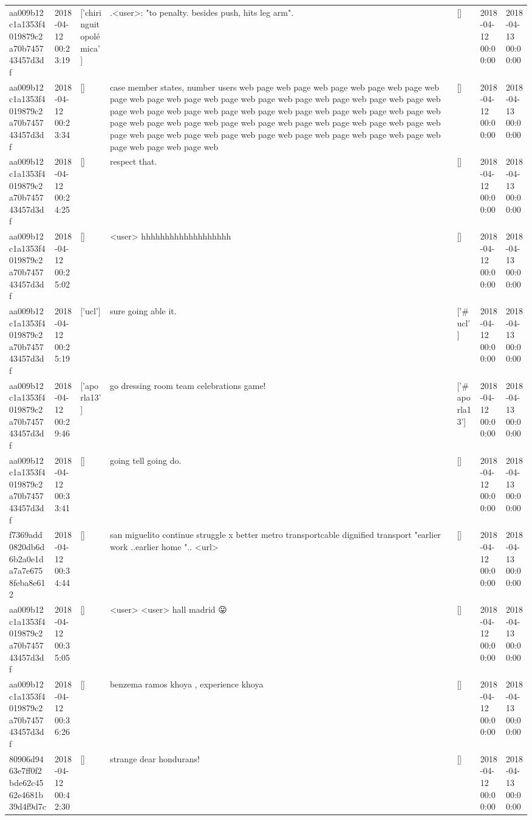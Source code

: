 \begin{tabular}{lllllll}
aa009b12c1a1353f4019879c2a70b745743457d3df & 2018-04-12 00:23:19 & ['chiringuitopolémica'] & .<user>: "to penalty. besides push, hits leg arm". & [] & 2018-04-12 00:00:00 & 2018-04-13 00:00:00 \\
aa009b12c1a1353f4019879c2a70b745743457d3df & 2018-04-12 00:23:34 & [] & case member states, number users web page web page web page web page web page web page web page web page web page web page web page web page web page web page web page web page web page web page web page web page web page web page web page web page web page web page web page web page web page web page web page web page web page web page web page web page web page web page web page web page web page web page web page web page web & [] & 2018-04-12 00:00:00 & 2018-04-13 00:00:00 \\
aa009b12c1a1353f4019879c2a70b745743457d3df & 2018-04-12 00:24:25 & [] & respect that. & [] & 2018-04-12 00:00:00 & 2018-04-13 00:00:00 \\
aa009b12c1a1353f4019879c2a70b745743457d3df & 2018-04-12 00:25:02 & [] & <user> hhhhhhhhhhhhhhhhhhh & [] & 2018-04-12 00:00:00 & 2018-04-13 00:00:00 \\
aa009b12c1a1353f4019879c2a70b745743457d3df & 2018-04-12 00:25:19 & ['ucl'] & sure going able it. & ['#ucl'] & 2018-04-12 00:00:00 & 2018-04-13 00:00:00 \\
aa009b12c1a1353f4019879c2a70b745743457d3df & 2018-04-12 00:29:46 & ['aporla13'] & go dressing room team celebrations game! & ['#aporla13'] & 2018-04-12 00:00:00 & 2018-04-13 00:00:00 \\
aa009b12c1a1353f4019879c2a70b745743457d3df & 2018-04-12 00:33:41 & [] & going tell going do. & [] & 2018-04-12 00:00:00 & 2018-04-13 00:00:00 \\
f7369add0820db6d6b2a0e1da7a7e6758feba8e612 & 2018-04-12 00:34:44 & [] & san miguelito continue struggle x better metro transportcable dignified transport "earlier work ..earlier home ".. <url> & [] & 2018-04-12 00:00:00 & 2018-04-13 00:00:00 \\
aa009b12c1a1353f4019879c2a70b745743457d3df & 2018-04-12 00:35:05 & [] & <user> <user> hall madrid 😛 & [] & 2018-04-12 00:00:00 & 2018-04-13 00:00:00 \\
aa009b12c1a1353f4019879c2a70b745743457d3df & 2018-04-12 00:36:26 & [] & benzema ramos khoya , experience khoya & [] & 2018-04-12 00:00:00 & 2018-04-13 00:00:00 \\
80906d9463e7ff0f2bde62c4562e4681b39d4f9d7c & 2018-04-12 00:42:30 & [] & strange dear hondurans! & [] & 2018-04-12 00:00:00 & 2018-04-13 00:00:00 \\

\end{tabular}
